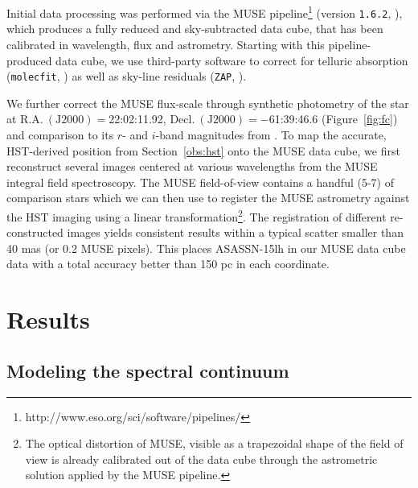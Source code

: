 \documentclass[traditabstract]{aa}
\begin{document}
Initial data processing was performed via the MUSE pipeline\footnote{http://www.eso.org/sci/software/pipelines/} (version \texttt{1.6.2}, \citealt{2014ASPC..485..451W}), which produces a fully reduced and sky-subtracted data cube, that has been calibrated in wavelength, flux and astrometry. Starting with this pipeline-produced data cube, we use third-party software to correct for telluric absorption (\texttt{molecfit}, \citet{2015A&A...576A..77S}) as well as sky-line residuals (\texttt{ZAP}, \citealt{2016MNRAS.458.3210S}).

We further correct the MUSE flux-scale through synthetic photometry of the star at $\mathrm{R.A.~(J2000)}=$22:02:11.92, $\mathrm{Decl.~(J2000)} = -$61:39:46.6 (Figure~\ref{fig:fc}) and comparison to its $r$- and $i$-band magnitudes from \citet{2016NatAs...1E...2L}. To map the accurate, HST-derived position from Section~\ref{obs:hst} onto the MUSE data cube, we first reconstruct several images centered at various wavelengths from the MUSE integral field spectroscopy. The MUSE field-of-view contains a handful (5-7) of comparison stars which we can then use to register the MUSE astrometry against the HST imaging using a linear transformation\footnote{The optical distortion of MUSE, visible as a trapezoidal shape of the field of view is already calibrated out of the data cube through the   astrometric solution applied by the MUSE pipeline.}. The registration of different re-constructed images yields consistent results within a typical scatter smaller than 40 mas (or 0.2 MUSE pixels). This places ASASSN-15lh in our MUSE data cube data with a total accuracy better than 150 pc in each coordinate.

\section{Results}
\label{sec:Res}

\subsection{Modeling the spectral continuum}
\end{document}
